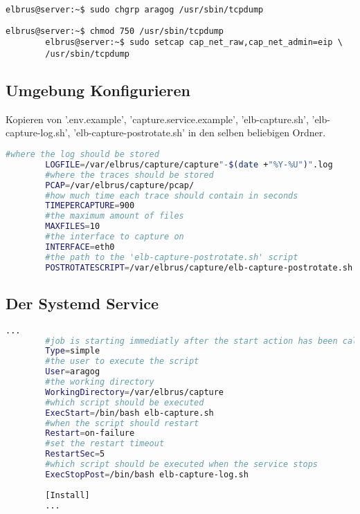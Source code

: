 \documentclass{article}
\begin{document}
	\begin{lstlisting}[caption={Zuweisen von 'tcpdump' zu der Gruppe 'aragog'.}]
		elbrus@server:~$ sudo chgrp aragog /usr/sbin/tcpdump
	\end{lstlisting}
	
	\begin{lstlisting}[caption={Ändern der Berechtigungen auf 'tcpdump'.}]
		elbrus@server:~$ chmod 750 /usr/sbin/tcpdump
		elbrus@server:~$ sudo setcap cap_net_raw,cap_net_admin=eip \
		/usr/sbin/tcpdump
	\end{lstlisting}
	
	\subsection[file config]{Umgebung Konfigurieren}
	Kopieren von '.env.example', 'capture.service.example', 'elb-capture.sh', 'elb-capture-log.sh', 'elb-capture-postrotate.sh' in den selben beliebigen Ordner. 

	\lstset{style=files}
	\begin{lstlisting}[caption={Anhand von '.env.example' eigene '.env' Datei anlegen}, language=bash]
		#where the log should be stored
		LOGFILE=/var/elbrus/capture/capture"-$(date +"%Y-%U")".log
		#where the traces should be stored
		PCAP=/var/elbrus/capture/pcap/
		#how much time each trace should contain in seconds
		TIMEPERCAPTURE=900
		#the maximum amount of files
		MAXFILES=10
		#the interface to capture on
		INTERFACE=eth0
		#the path to the 'elb-capture-postrotate.sh' script
		POSTROTATESCRIPT=/var/elbrus/capture/elb-capture-postrotate.sh
	\end{lstlisting}

	\subsection[systemd service]{Der Systemd Service}
	\begin{lstlisting}[caption={capture.service.example - Die Variable 'WorkingDirectory', Die Variable 'User' sowie die Variable 'ExecStopPost' anpassen.},language=bash ,keywords={WorkingDirectory, User, ExecStopPost}, keywordstyle=\color{red}, firstnumber=3]
		...
		#job is starting immediatly after the start action has been called
		Type=simple
		#the user to execute the script
		User=aragog
		#the working directory
		WorkingDirectory=/var/elbrus/capture
		#which script should be executed
		ExecStart=/bin/bash elb-capture.sh
		#when the script should restart
		Restart=on-failure
		#set the restart timeout
		RestartSec=5
		#which script should be executed when the service stops
		ExecStopPost=/bin/bash elb-capture-log.sh
		
		[Install]
		...
	\end{lstlisting}
	
\end{document}
